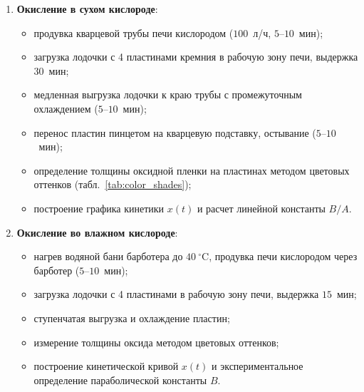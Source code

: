 \documentclass[12pt,a4paper]{article}
\theoremstyle{plain}
\theoremstyle{definition}
\theoremstyle{remark}
\numberwithin{equation}{section}
\begin{document}
\begin{enumerate}
    \item \textbf{Окисление в сухом кислороде}:
    \begin{itemize}
        \item продувка кварцевой трубы печи кислородом ($100$~л/ч, $5\text{--}10$~мин);
        \item загрузка лодочки с 4 пластинами кремния в рабочую зону печи, выдержка $30$~мин;
        \item медленная выгрузка лодочки к краю трубы с промежуточным охлаждением ($5\text{--}10$~мин);
        \item перенос пластин пинцетом на кварцевую подставку, остывание ($5\text{--}10$~мин);
        \item определение толщины оксидной пленки на пластинах методом цветовых оттенков (табл.~\ref{tab:color_shades});
        \item построение графика кинетики $x(t)$ и расчет линейной константы $B/A$.
    \end{itemize}
    \item \textbf{Окисление во влажном кислороде}:
    \begin{itemize}
        \item нагрев водяной бани барботера до $40~^\circ\mathrm{C}$, продувка печи кислородом через барботер ($5\text{--}10$~мин);
        \item загрузка лодочки с 4 пластинами в рабочую зону печи, выдержка $15$~мин;
        \item ступенчатая выгрузка и охлаждение пластин;
        \item измерение толщины оксида методом цветовых оттенков;
        \item построение кинетической кривой $x(t)$ и экспериментальное определение параболической константы $B$.
    \end{itemize}
\end{enumerate}
\end{document}
